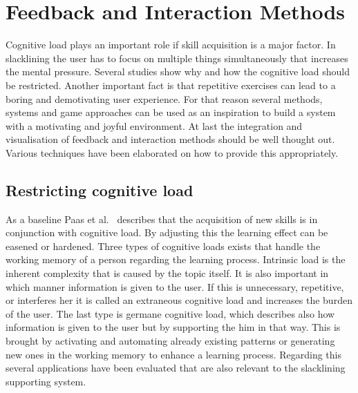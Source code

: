 \section{Feedback and Interaction Methods}\label{2_4_methods}

Cognitive load plays an important role if skill acquisition is a major factor. In slacklining the user has to focus on multiple things simultaneously that increases the mental pressure. Several studies show why and how the cognitive load should be restricted. Another important fact is that repetitive exercises can lead to a boring and demotivating user experience. For that reason several methods, systems and game approaches can be used as an inspiration to build a system with a motivating and joyful environment. At last the integration and visualisation of feedback and interaction methods should be well thought out. Various techniques have been elaborated on how to provide this appropriately.

\subsection{Restricting cognitive load}

As a baseline Paas et al.~\cite{Paas2003-xt} describes that the acquisition of new skills is in conjunction with cognitive load. By adjusting this the learning effect can be easened or hardened. Three types of cognitive loads exists that handle the working memory of a person regarding the learning process. Intrinsic load is the inherent complexity that is caused by the topic itself. It is also important in which manner information is given to the user. If this is unnecessary, repetitive, or interferes her it is called an extraneous cognitive load and increases the burden of the user. The last type is germane cognitive load, which describes also how information is given to the user but by supporting the him in that way. This is brought by activating and automating already existing patterns or generating new ones in the working memory to enhance a learning process. Regarding this several applications have been evaluated that are also relevant to the slacklining supporting system.

